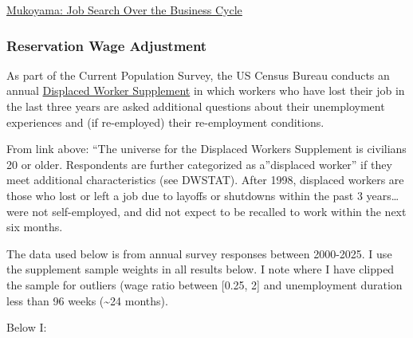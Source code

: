 \href{https://www.aeaweb.org/articles?id=10.1257/mac.20160202}{Mukoyama:
Job Search Over the Business Cycle}


\subsubsection{Reservation Wage
Adjustment}\label{reservation-wage-adjustment}

As part of the Current Population Survey, the US Census Bureau conducts
an annual
\href{https://cps.ipums.org/cps/dw_sample_notes.shtml}{Displaced Worker
Supplement} in which workers who have lost their job in the last three
years are asked additional questions about their unemployment
experiences and (if re-employed) their re-employment conditions.

From link above: ``The universe for the Displaced Workers Supplement is
civilians 20 or older. Respondents are further categorized as
a''displaced worker'' if they meet additional characteristics (see
DWSTAT). After 1998, displaced workers are those who lost or left a job
due to layoffs or shutdowns within the past 3 years\ldots were not
self-employed, and did not expect to be recalled to work within the next
six months.

The data used below is from annual survey responses between 2000-2025. I
use the supplement sample weights in all results below. I note where I
have clipped the sample for outliers (wage ratio between {[}0.25, 2{]}
and unemployment duration less than 96 weeks (\textasciitilde24 months).

Below I:

